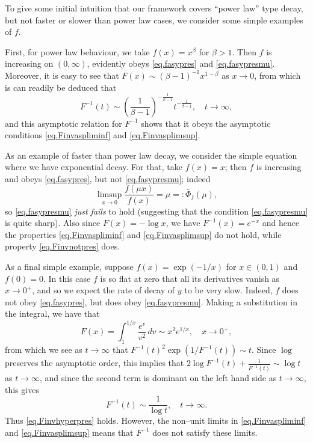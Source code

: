 \documentclass[a4paper,10pt,reqno]{amsart}
\numberwithin{equation}{section}
\theoremstyle{definition}
\theoremstyle{remark}
\DeclareMathOperator{\1}{\mathbbm 1}
\begin{document}
	To give some initial intuition that our framework covers ``power law'' type decay, but not faster or slower than power law cases, we consider some simple examples of $f$. 
	
	First, for power law behaviour, we take $f(x)=x^\beta$ for $\beta>1$. Then $f$ is increasing on $(0,\infty)$, evidently obeys \eqref{eq.fasypres} and \eqref{eq.fasypresmu}. Moreover, it is easy to see that $F(x)\sim (\beta-1)^{-1}x^{1-\beta}$ as $x\to 0$, from which is can readily be deduced that      
	\[
	F^{-1}(t)\sim \left(\frac{1}{\beta-1}\right)^{-\frac{1}{\beta-1}} t^{-\frac{1}{\beta-1}}, \quad t\to\infty,
	\]
	and this asymptotic relation for $F^{-1}$ shows that it obeys the asymptotic conditions \eqref{eq.Finvaspliminf} and \eqref{eq.Finvasplimsup}. 
	
	As an example of faster than power law decay, we consider the simple equation where we have exponential decay. For that, take $f(x)=x$; then $f$ is increasing and obeys \eqref{eq.fasypres}, but not \eqref{eq.fasypresmu}; indeed 
	\[
	\limsup_{x\to 0} \frac{f(\mu x)}{f(x)}=\mu=:\bar{\Phi}_f(\mu),
	\] 
	so \eqref{eq.fasypresmu} \textit{just fails} to hold (suggesting that the condition \eqref{eq.fasypresmu} is quite sharp). Also since $F(x)=-\log x$, we have $F^{-1}(x)=e^{-x}$ and hence the properties \eqref{eq.Finvaspliminf} and \eqref{eq.Finvasplimsup} do not hold, while property 
	\eqref{eq.Finvnotpres} does. 
	
	As a final simple example, suppose $f(x)=\exp(-1/x)$ for $x\in (0,1)$ and $f(0)=0$. In this case $f$ is so flat at zero that all its derivatives vanish as $x\to 0^+$, and so we expect the rate of decay of $y$ to be very slow.  Indeed, $f$ does not obey \eqref{eq.fasypres}, but does obey \eqref{eq.fasypresmu}. Making a substitution in the integral, we have that  
	\[
	F(x)=\int_{1}^{1/x} \frac{e^v}{v^2}\,dv \sim x^2 e^{1/x}, \quad x\to 0^+,
	\]
	from which we see as $t\to\infty$ that $F^{-1}(t)^2\exp(1/F^{-1}(t))\sim t$. Since $\log$ preserves the asymptotic order, this implies that  $2\log F^{-1}(t)+\frac{1}{F^{-1}(t)}\sim \log t$ as $t\to\infty$, and since the second term is dominant on the left hand side as $t\to \infty$, this gives
	\[
	F^{-1}(t)\sim \frac{1}{\log t}, \quad t\to\infty.
	\] 
	Thus \eqref{eq.Finvhyperpres} holds. However, the non--unit limits in \eqref{eq.Finvaspliminf} and \eqref{eq.Finvasplimsup} means that $F^{-1}$ does not satisfy these limits. 
	
\end{document}

